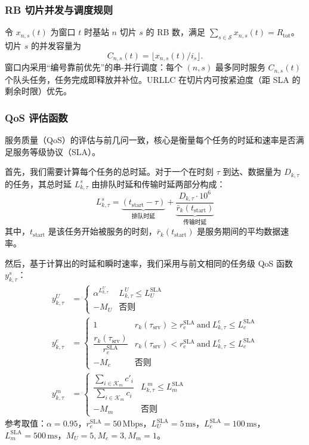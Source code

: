 \subsubsection{RB 切片并发与调度规则}

令 $x_{n,s}(t)$ 为窗口 $t$ 时基站 $n$ 切片 $s$ 的 RB 数，满足 $\sum_{s\in\mathcal{S}}x_{n,s}(t)=R_{\text{tot}}$。切片 $s$ 的并发容量为
\begin{equation}
 C_{n,s}(t)=\big\lfloor x_{n,s}(t)/i_s\big\rfloor.
\end{equation}
窗口内采用“编号靠前优先”的串-并行调度：每个 $(n,s)$ 最多同时服务 $C_{n,s}(t)$ 个队头任务，任务完成即释放并补位。URLLC 在切片内可按紧迫度（距 SLA 的剩余时限）优先。

\subsubsection{QoS 评估函数}

服务质量（QoS）的评估与前几问一致，核心是衡量每个任务的时延和速率是否满足服务等级协议（SLA）。

首先，我们需要计算每个任务的总时延。对于一个在时刻 $\tau$ 到达、数据量为 $D_{k,\tau}$ 的任务，其总时延 $L^{s}_{k,\tau}$ 由排队时延和传输时延两部分构成：
\begin{equation}
    L^{s}_{k,\tau} = \underbrace{(t_{\text{start}} - \tau)}_{\text{排队时延}} + \underbrace{\frac{D_{k,\tau} \cdot 10^6}{\bar{r}_k(t_{\text{start}})}}_{\text{传输时延}}
\end{equation}
其中，$t_{\text{start}}$ 是该任务开始被服务的时刻，$\bar{r}_k(t_{\text{start}})$ 是服务期间的平均数据速率。

然后，基于计算出的时延和瞬时速率，我们采用与前文相同的任务级 QoS 函数 $y^{s}_{k,\tau}$：
\begin{align}
 y^{U}_{k,\tau} &= \begin{cases}
 \alpha^{L^{U}_{k,\tau}} & L^{U}_{k,\tau}\le L^{\text{SLA}}_{U}\\
 -M_U & \text{否则}
 \end{cases} \\
y^{e}_{k,\tau} &= \begin{cases}
 1 & r_{k}(\tau_\text{srv})\ge r^{\text{SLA}}_{e}\ \text{and}\ L^{e}_{k,\tau}\le L^{\text{SLA}}_{e}\\
 \dfrac{r_{k}(\tau_\text{srv})}{r^{\text{SLA}}_{e}} & r_{k}(\tau_\text{srv})< r^{\text{SLA}}_{e}\ \text{and}\ L^{e}_{k,\tau}\le L^{\text{SLA}}_{e}\\
 -M_e & \text{否则}
 \end{cases} \\
 y^{m}_{k,\tau} &= \begin{cases}
 \dfrac{\sum\limits_{i\in\mathcal{K}_m}c'_i}{\sum\limits_{i\in\mathcal{K}_m}c_i} & L^{\,m}_{k,\tau}\le L^{\text{SLA}}_{m}\\
 -M_m & \text{否则}
 \end{cases}
\end{align}
参考取值：$\alpha=0.95$，$r^{\text{SLA}}_e=50\,\mathrm{Mbps}$，$L^{\text{SLA}}_{U}=5\,\mathrm{ms}$，$L^{\text{SLA}}_{e}=100\,\mathrm{ms}$，$L^{\text{SLA}}_{m}=500\,\mathrm{ms}$，$M_U=5, M_e=3, M_m=1$。


